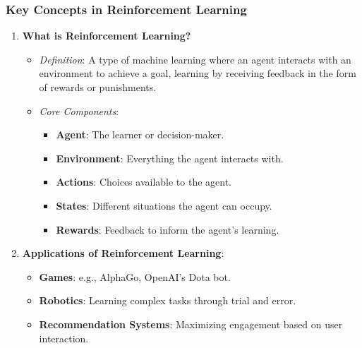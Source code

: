 \documentclass[aspectratio=169]{beamer}
\begin{document}
\begin{frame}[fragile]
    \frametitle{Key Concepts in Reinforcement Learning}
    \begin{enumerate}
        \item \textbf{What is Reinforcement Learning?}
        \begin{itemize}
            \item \textit{Definition}: A type of machine learning where an agent interacts with an environment to achieve a goal, learning by receiving feedback in the form of rewards or punishments.
            \item \textit{Core Components}:
            \begin{itemize}
                \item \textbf{Agent}: The learner or decision-maker.
                \item \textbf{Environment}: Everything the agent interacts with.
                \item \textbf{Actions}: Choices available to the agent.
                \item \textbf{States}: Different situations the agent can occupy.
                \item \textbf{Rewards}: Feedback to inform the agent's learning.
            \end{itemize}
        \end{itemize}

        \item \textbf{Applications of Reinforcement Learning}:
        \begin{itemize}
            \item \textbf{Games}: e.g., AlphaGo, OpenAI’s Dota bot.
            \item \textbf{Robotics}: Learning complex tasks through trial and error.
            \item \textbf{Recommendation Systems}: Maximizing engagement based on user interaction.
        \end{itemize}
    \end{enumerate}
\end{frame}
\end{document}
